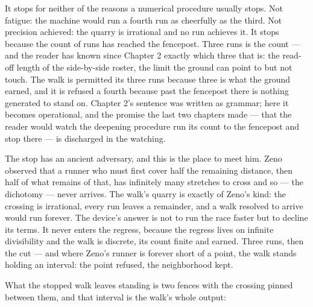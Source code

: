 It stops for neither of the reasons a numerical procedure usually stops. Not fatigue:
the machine would run a fourth run as cheerfully as the third. Not precision achieved:
the quarry is irrational and no run achieves it. It stops because the count of runs
has reached the fencepost. Three runs is the count --- and the reader has known since
Chapter 2 exactly which three that is: the read-off length of the side-by-side
roster, the limit the ground can point to but not touch. The walk is permitted its
three runs because three is what the ground earned, and it is refused a fourth
because past the fencepost there is nothing generated to stand on. Chapter 2's
sentence was written as grammar; here it becomes operational, and the promise the
last two chapters made --- that the reader would watch the deepening procedure run
its count to the fencepost and stop there --- is discharged in the watching.

The stop has an ancient adversary, and this is the place to meet him. Zeno observed
that a runner who must first cover half the remaining distance, then half of what
remains of that, has infinitely many stretches to cross and so --- the dichotomy ---
never arrives. The walk's quarry is exactly of Zeno's kind: the crossing is
irrational, every run leaves a remainder, and a walk resolved to arrive would run
forever. The device's answer is not to run the race faster but to decline its terms.
It never enters the regress, because the regress lives on infinite divisibility and
the walk is discrete, its count finite and earned. Three runs, then the cut --- and
where Zeno's runner is forever short of a point, the walk stands holding an
interval: the point refused, the neighborhood kept.

What the stopped walk leaves standing is two fences with the crossing pinned between
them, and that interval is the walk's whole output:

